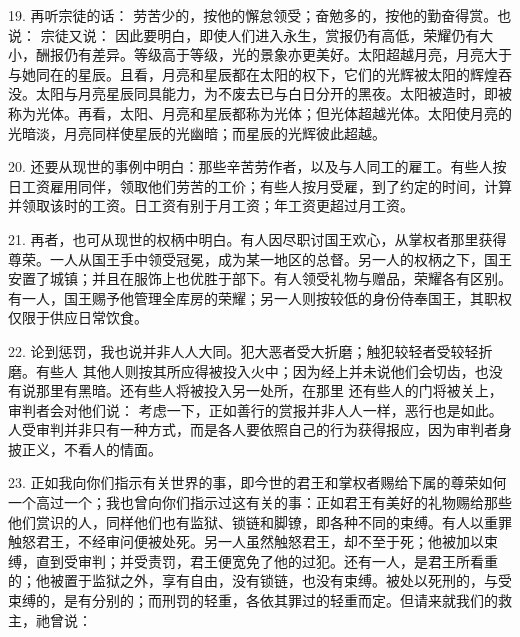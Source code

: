 19. 再听宗徒的话： 劳苦少的，按他的懈怠领受；奋勉多的，按他的勤奋得赏。也说： 宗徒又说： 因此要明白，即使人们进入永生，赏报仍有高低，荣耀仍有大小，酬报仍有差异。等级高于等级，光的景象亦更美好。太阳超越月亮，月亮大于与她同在的星辰。且看，月亮和星辰都在太阳的权下，它们的光辉被太阳的辉煌吞没。太阳与月亮星辰同具能力，为不废去已与白日分开的黑夜。太阳被造时，即被称为光体。再看，太阳、月亮和星辰都称为光体；但光体超越光体。太阳使月亮的光暗淡，月亮同样使星辰的光幽暗；而星辰的光辉彼此超越。\par

20. 还要从现世的事例中明白：那些辛苦劳作者，以及与人同工的雇工。有些人按日工资雇用同伴，领取他们劳苦的工价；有些人按月受雇，到了约定的时间，计算并领取该时的工资。日工资有别于月工资；年工资更超过月工资。\par

21. 再者，也可从现世的权柄中明白。有人因尽职讨国王欢心，从掌权者那里获得尊荣。一人从国王手中领受冠冕，成为某一地区的总督。另一人的权柄之下，国王安置了城镇；并且在服饰上也优胜于部下。有人领受礼物与赠品，荣耀各有区别。有一人，国王赐予他管理全库房的荣耀；另一人则按较低的身份侍奉国王，其职权仅限于供应日常饮食。\par

22. 论到惩罚，我也说并非人人大同。犯大恶者受大折磨；触犯较轻者受较轻折磨。有些人 其他人则按其所应得被投入火中；因为经上并未说他们会切齿，也没有说那里有黑暗。还有些人将被投入另一处所，在那里 还有些人的门将被关上，审判者会对他们说： 考虑一下，正如善行的赏报并非人人一样，恶行也是如此。人受审判并非只有一种方式，而是各人要依照自己的行为获得报应，因为审判者身披正义，不看人的情面。\par

23. 正如我向你们指示有关世界的事，即今世的君王和掌权者赐给下属的尊荣如何一个高过一个；我也曾向你们指示过这有关的事：正如君王有美好的礼物赐给那些他们赏识的人，同样他们也有监狱、锁链和脚镣，即各种不同的束缚。有人以重罪触怒君王，不经审问便被处死。另一人虽然触怒君王，却不至于死；他被加以束缚，直到受审判；并受责罚，君王便宽免了他的过犯。还有一人，是君王所看重的；他被置于监狱之外，享有自由，没有锁链，也没有束缚。被处以死刑的，与受束缚的，是有分别的；而刑罚的轻重，各依其罪过的轻重而定。但请来就我们的救主，祂曾说：\par

